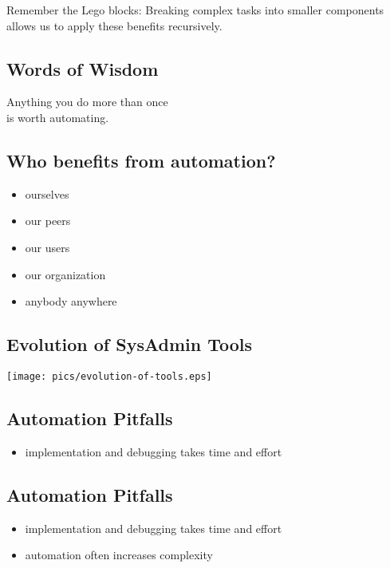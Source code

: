 \documentclass[xga]{xdvislides}
\begin{document}
\vspace{.5in}
Remember the Lego blocks:  Breaking complex tasks
into smaller components allows us to apply these
benefits recursively.

\subsection{Words of Wisdom}
\vspace*{\fill}
\Huge
\begin{center}
Anything you do more than once \\
is worth automating.
\end{center}
\Normalsize
\vspace*{\fill}

\subsection{Who benefits from automation?}
\begin{itemize}
	\item ourselves
	\item our peers
	\item our users
	\item our organization
	\item anybody anywhere
\end{itemize}

\subsection{Evolution of SysAdmin Tools}
\vspace*{\fill}
\begin{center}
	\texttt{[image: pics/evolution-of-tools.eps]}
\end{center}
\vspace*{\fill}

\subsection{Automation Pitfalls}
\begin{itemize}
	\item implementation and debugging takes time and effort
\end{itemize}

\subsection{Automation Pitfalls}
\begin{itemize}
	\item implementation and debugging takes time and effort
	\item automation often increases complexity
\end{itemize}
\end{document}
